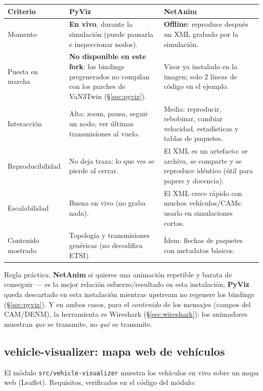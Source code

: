 \documentclass[11pt,a4paper]{article}
\begin{document}
\begin{center}
\small
\begin{tabular}{@{}p{}p{}p{}@{}}
\toprule
\textbf{Criterio} & \textbf{PyViz} & \textbf{NetAnim} \\
\midrule
Momento & \textbf{En vivo}, durante la simulaci\'on (puede pausarla e
inspeccionar nodos). & \textbf{Offline}: reproduce despu\'es un XML grabado
por la simulaci\'on. \\
Puesta en marcha & \textbf{No disponible en este fork}: los bindings
pregenerados no compilan con los parches de VaN3Twin
(\S\ref{sec:pyviz}). & Visor ya instalado en la imagen; solo 2 l\'ineas
de c\'odigo en el ejemplo. \\
Interacci\'on & Alta: zoom, pausa, seguir un nodo, ver \'ultimas
transmisiones al vuelo. & Media: reproducir, rebobinar, cambiar velocidad,
estad\'isticas y tablas de paquetes. \\
Reproducibilidad & No deja traza: lo que ves se pierde al cerrar. & El XML
es un artefacto: se archiva, se comparte y se reproduce id\'entico (\'util
para papers y docencia). \\
Escalabilidad & Buena en vivo (no graba nada). & El XML crece r\'apido con
muchos veh\'iculos/CAMs: usarlo en simulaciones cortas. \\
Contenido mostrado & Topolog\'ia y transmisiones gen\'ericas (no decodifica
ETSI). & \'Idem: flechas de paquetes con metadatos b\'asicos. \\
\bottomrule
\end{tabular}
\end{center}

Regla pr\'actica: \textbf{NetAnim} si quieres una animaci\'on repetible y
barata de conseguir --- es la mejor relaci\'on esfuerzo/resultado en esta
instalaci\'on; \textbf{PyViz} queda descartado en esta
instalaci\'on mientras upstream no regenere los bindings
(\S\ref{sec:pyviz}). Y en ambos casos,
para el \emph{contenido} de los mensajes (campos del CAM/DENM), la
herramienta es Wireshark (\S\ref{sec:wireshark}): los animadores muestran
\emph{que} se transmite, no \emph{qu\'e} se transmite.

\subsection{vehicle-visualizer: mapa web de veh\'iculos}
\label{sec:vehviz}

El m\'odulo \texttt{src/vehicle-visualizer} muestra los veh\'iculos en vivo
sobre un mapa web (Leaflet). Requisitos, verificados en el c\'odigo del
m\'odulo:
\end{document}
